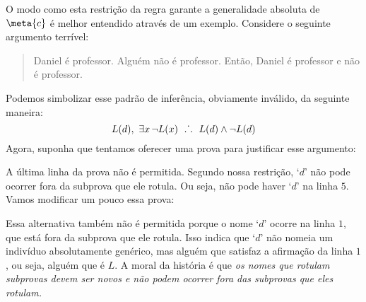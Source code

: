 O modo como esta restrição da regra garante a generalidade absoluta de $\meta{c}$ é melhor entendido através de um exemplo. Considere o seguinte argumento terrível:
	\begin{quote}
		Daniel é professor. Alguém não é professor. Então, Daniel é professor e não é professor.
	\end{quote}
Podemos simbolizar esse padrão de inferência, obviamente inválido, da seguinte maneira:
$$\mathord{L}(d),\,\, \exists x\, \neg\mathord{L}(x) \ \mathrel{\ldotp\dot{}\,\ldotp} \ \mathord{L}(d) \wedge \neg \mathord{L}(d)$$
Agora, suponha que tentamos oferecer uma prova para justificar esse argumento:

\begin{fitchproof}
	\open	
	\close
\end{fitchproof}
A última linha da prova não é permitida. Segundo nossa restrição, `$d$' não pode ocorrer fora da subprova que ele rotula. Ou seja, não pode haver `$d$' na linha $5$.
Vamos modificar um pouco essa prova:
\begin{fitchproof}
	\open	
	\close
\end{fitchproof}
Essa alternativa também não é permitida porque o nome `$d$' ocorre na linha $1$, que está fora da subprova que ele rotula.
Isso indica que `$d$' não nomeia um indivíduo absolutamente genérico, mas alguém que satisfaz a afirmação da linha $1$, ou seja, alguém que é $L$.
A moral  da história é que \emph{os nomes que rotulam subprovas devem ser novos e não podem ocorrer fora das subprovas que eles rotulam.}

